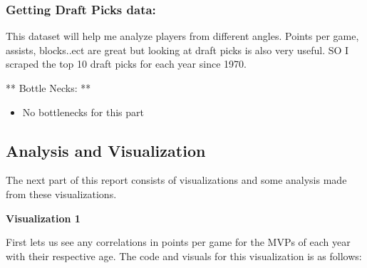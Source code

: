 \documentclass[11pt]{article}
\providecommand{\tightlist}{%
      \setlength{\itemsep}{0pt}\setlength{\parskip}{0pt}}
\begin{document}
    \subsubsection{Getting Draft Picks
data:}\label{getting-draft-picks-data}

This dataset will help me analyze players from different angles. Points
per game, assists, blocks..ect are great but looking at draft picks is
also very useful. SO I scraped the top 10 draft picks for each year
since 1970.

** Bottle Necks: **

\begin{itemize}
\tightlist
\item
  No bottlenecks for this part
\end{itemize}

    \subsection{Analysis and
Visualization}\label{analysis-and-visualization}

The next part of this report consists of visualizations and some
analysis made from these visualizations.

\textbf{Visualization 1}

First lets us see any correlations in points per game for the MVPs of
each year with their respective age. The code and visuals for this
visualization is as follows:
\end{document}
